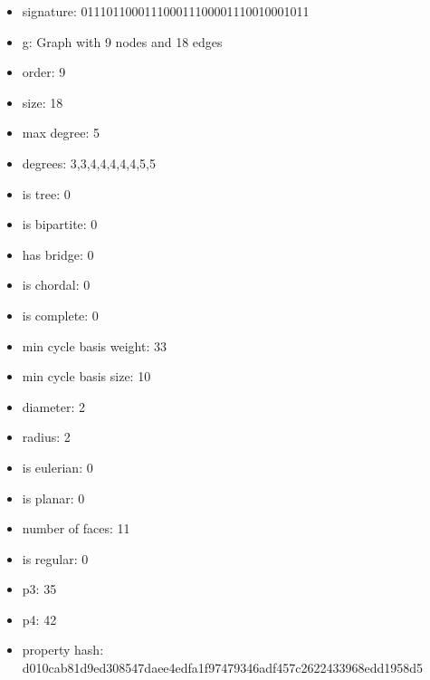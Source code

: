 \newpage
\begin{figure}
\end{figure}
\begin{itemize}
\item signature: 011101100011100011100001110010001011
\item g: Graph with 9 nodes and 18 edges
\item order: 9
\item size: 18
\item max degree: 5
\item degrees: 3,3,4,4,4,4,4,5,5
\item is tree: 0
\item is bipartite: 0
\item has bridge: 0
\item is chordal: 0
\item is complete: 0
\item min cycle basis weight: 33
\item min cycle basis size: 10
\item diameter: 2
\item radius: 2
\item is eulerian: 0
\item is planar: 0
\item number of faces: 11
\item is regular: 0
\item p3: 35
\item p4: 42
\item property hash: d010cab81d9ed308547daee4edfa1f97479346adf457c2622433968edd1958d5
\end{itemize}
